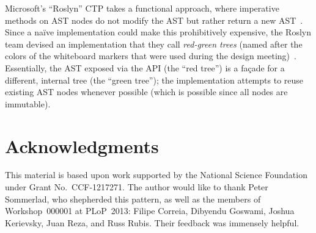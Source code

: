 \documentclass[prodmode]{acmlarge}
\begin{document}
Microsoft's ``Roslyn'' CTP takes a functional approach, where imperative
methods on AST nodes do not modify the AST but rather return a new
AST~\cite{vogel12roslyn}.  Since a na\"{i}ve implementation could make this
prohibitively expensive, the Roslyn team devised an implementation that
they call \textit{red-green trees} (named after the colors of the
whiteboard markers that were used during the design
meeting)~\cite{lippert12persistence}.  Essentially, the AST exposed via the API
(the ``red tree'') is a fa\c{c}ade for a different, internal tree (the ``green
tree''); the implementation attempts to reuse existing AST nodes whenever
possible (which is possible since all nodes are immutable).



\section*{Acknowledgments}
This material is based upon work supported by the National Science Foundation
under Grant No.~CCF-1217271.  The author would like to thank Peter Sommerlad,
who shepherded this pattern, as well as the members of Workshop~000001 at
PLoP~2013: Filipe Correia, Dibyendu Goswami, Joshua Kerievsky, Juan Reza, and
Russ Rubis.  Their feedback was immensely helpful.




\end{document}
